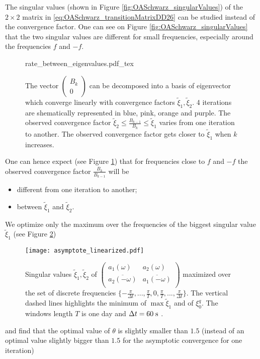 The singular values (shown in Figure \ref{fig:OASchwarz_singularValues})
of the $2\times 2$ matrix
in \eqref{eq:OASchwarz_transitionMatrixDD26}
can be studied instead of the convergence factor.
One can see on Figure \ref{fig:OASchwarz_singularValues} that
the two singular values are different for small frequencies,
especially around the frequencies $f$ and $-f$.
\begin{figure}
	\centering
	{rate_between_eigenvalues.pdf_tex}
	\caption{The vector $\begin{pmatrix} B_k \\ 0 \end{pmatrix}$ can be
		decomposed
	into a basis of eigenvector which converge linearly with
	convergence factors $\widetilde{\xi}_1, \widetilde{\xi}_2$.
	4 iterations are shematically represented in blue, pink, orange and
	purple. The
	observed convergence factor
	$\widetilde{\xi}_2 \leq \frac{B_{k-1}}{B_k} \leq \widetilde{\xi}_1$
	varies from one iteration to another. The observed convergence
	factor gets closer to $\widetilde{\xi}_1$ when $k$ increases.
	}
	\label{fig:OASchwarz_rateBetweenEigenvalues}
\end{figure}

One can hence expect (see
Figure \ref{fig:OASchwarz_rateBetweenEigenvalues}) that for frequencies close to $f$ and $-f$
the observed convergence factor
$\frac{B_k}{B_{k-1}}$ will be
\begin{itemize}
	\item different from one iteration to another;
	\item between $\widetilde{\xi}_1$ and $\widetilde{\xi}_2$.
\end{itemize}
We optimize only the maximum over the frequencies of the biggest
singular value $\widetilde{\xi}_1$ (see Figure
\ref{fig:OASchwarz_nonasymptotic})
\begin{figure}
    \centering
    \texttt{[image: asymptote\_linearized.pdf]}
	\caption{Singular values
	$\widetilde{\xi}_1, \widetilde{\xi}_2$ of $\begin{pmatrix}
	a_1(\omega) & a_2(\omega) \\
	\overline{a_2(-\omega)} & \overline{a_1(-\omega)} \\
	\end{pmatrix}$ maximized over the set of discrete
	frequencies
	$\{-\frac{\pi}{\Delta t}, ..., \frac{\pi}{T}, 0,
	\frac{\pi}{T},..., \frac{\pi}{\Delta t}\}$.
	The vertical dashed lines highlights the minimum
	of $\max \widetilde{\xi}_1$ and of $\xi_0^q$.
	The windows length $T$ is one day
	and $\Delta t=60\;{\rm s}$ .
	}
    \label{fig:OASchwarz_nonasymptotic}
\end{figure}
and find that the optimal value of $\theta$ is slightly smaller than
$1.5$ (instead of an optimal value slightly bigger than $1.5$
for the asymptotic convergence for one iteration)
